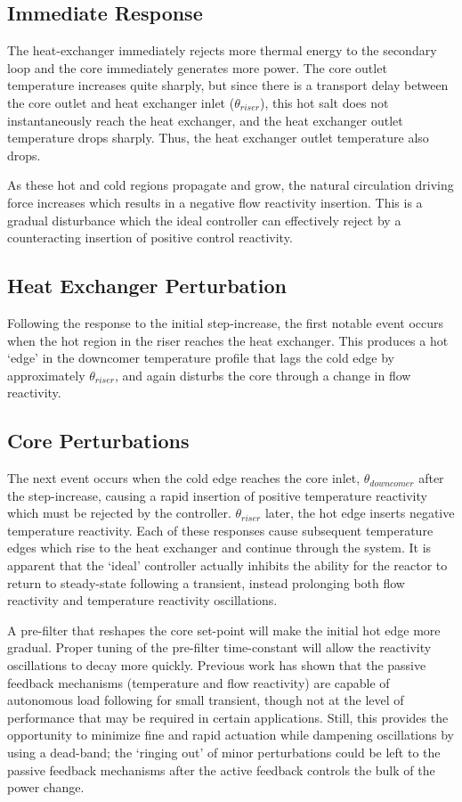 \subsection{Immediate Response}
The heat-exchanger immediately rejects more thermal energy to the secondary loop and the core immediately generates more power. The core outlet temperature increases quite sharply, but since there is a transport delay between the core outlet and heat exchanger inlet ($\theta_{riser}$), this hot salt does not instantaneously reach the heat exchanger, and the heat exchanger outlet temperature drops sharply. Thus, the heat exchanger outlet temperature also drops. 

As these hot and cold regions propagate and grow, the natural circulation driving force increases which results in a negative flow reactivity insertion. This is a gradual disturbance which the ideal controller can effectively reject by a counteracting insertion of positive control reactivity. 

\subsection{Heat Exchanger Perturbation}
Following the response to the initial step-increase, the first notable event occurs when the hot region in the riser reaches the heat exchanger. This produces a hot `edge' in the downcomer temperature profile that lags the cold edge by approximately $\theta_{riser}$, and again disturbs the core through a change in flow reactivity.

\subsection{Core Perturbations}
The next event occurs when the cold edge reaches the core inlet, $\theta_{downcomer}$ after the step-increase, causing a rapid insertion of positive temperature reactivity which must be rejected by the controller. $\theta_{riser}$ later, the hot edge inserts negative temperature reactivity. Each of these responses cause subsequent temperature edges which rise to the heat exchanger and continue through the system. It is apparent that the `ideal' controller actually inhibits the ability for the reactor to return to steady-state following a transient, instead prolonging both flow reactivity and temperature reactivity oscillations.

A pre-filter that reshapes the core set-point will make the initial hot edge more gradual. Proper tuning of the pre-filter time-constant will allow the reactivity oscillations to decay more quickly. Previous work \cite{CarterNumerical} has shown that the passive feedback mechanisms (temperature and flow reactivity) are capable of autonomous load following for small transient, though not at the level of performance that may be required in certain applications. Still, this provides the opportunity to minimize fine and rapid actuation while dampening oscillations by using a dead-band; the `ringing out' of minor perturbations could be left to the passive feedback mechanisms after the active feedback controls the bulk of the power change.

